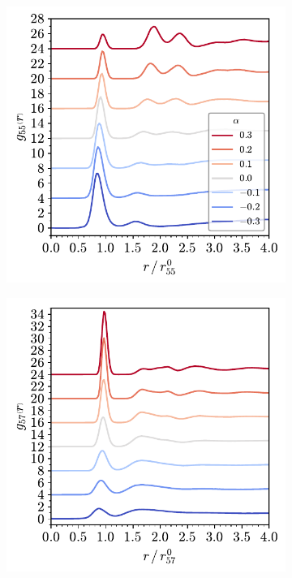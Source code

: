 \begin{figure}[bt]
     \centering
     
     \begin{subfigure}[b]{0.45\textwidth}
         \centering
         \includegraphics[width=\textwidth]{./figures/targeted_opt/partial_gr_55_567.pdf}
         \caption{}
         \label{fig:toptrdf1}
     \end{subfigure}
     \hfill
     \begin{subfigure}[b]{0.45\textwidth}
         \centering
         \includegraphics[width=\textwidth]{./figures/targeted_opt/partial_gr_57_567.pdf}
         \caption{}
         \label{fig:toptrdf2}
     \end{subfigure}
     

\end{figure}
